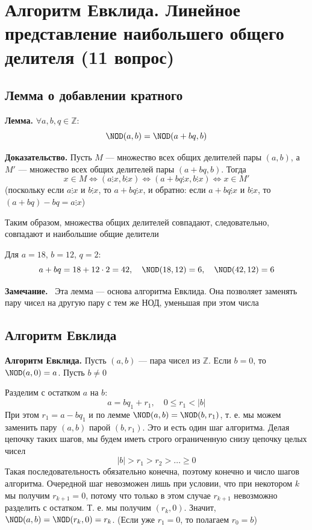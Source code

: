 \documentclass[a4paper,12pt]{article}
\newcommand{\myremark}{\textbf{Замечание.}\ }
\theoremstyle{definition}
\theoremstyle{plain}
\theoremstyle{remark}
\begin{document}
	
	
	
	
	\newpage
	\section{Алгоритм Евклида. Линейное представление наибольшего общего делителя (11 вопрос)}
	
	\subsection{Лемма о добавлении кратного}
	
	\noindent \textbf{Лемма.}
	$\forall a, b, q \in \mathbb{Z}$:
	\[
	\NOD(a, b) = \NOD(a + bq, b)
	\]
	
	\medskip
	\noindent \textbf{Доказательство.}
	Пусть $M$ — множество всех общих делителей пары $(a, b)$, а $M'$ — множество всех общих делителей пары $(a + bq, b)$. Тогда
	\[
	x \in M \iff (a \vdots x, b \vdots x) \iff (a + bq \vdots x, b \vdots x) \iff x \in M'
	\]
	(поскольку если $a \vdots x$ и $b \vdots x$, то $a + bq \vdots x$, и обратно: если $a + bq \vdots x$ и $b \vdots x$, то $(a + bq) - bq = a \vdots x$)
	
	Таким образом, множества общих делителей совпадают, следовательно, совпадают и наибольшие общие делители
	
	\begin{tcolorbox}[colback=blue!5, colframe=blue!40!black, title=Пример]
	Для $a = 18$, $b = 12$, $q = 2$:
	\[
	a + bq = 18 + 12 \cdot 2 = 42,\quad \NOD(18,12)=6,\quad \NOD(42,12)=6
	\]
	\end{tcolorbox}
	
	\myremark
	Эта лемма — основа алгоритма Евклида. Она позволяет заменять пару чисел на другую пару с тем же НОД, уменьшая при этом числа
	
	\subsection{Алгоритм Евклида}
	
	\noindent \textbf{Алгоритм Евклида.}
	Пусть $(a, b)$ — пара чисел из $\mathbb{Z}$. Если $b = 0$, то $\NOD(a, 0) = a$. Пусть $b \neq 0$
	
	Разделим с остатком $a$ на $b$:
	\[
	a = bq_1 + r_1, \quad 0 \leq r_1 < |b|
	\]
	При этом $r_1 = a - bq_1$ и по лемме $\NOD(a, b) = \NOD(b, r_1)$, т. е. мы можем заменить пару $(a, b)$ парой $(b, r_1)$. Это и есть один шаг алгоритма. Делая цепочку таких шагов, мы будем иметь строго ограниченную снизу цепочку целых чисел
	\[
	|b| > r_1 > r_2 > \dots \geq 0
	\]
	Такая последовательность обязательно конечна, поэтому конечно и число шагов алгоритма. Очередной шаг невозможен лишь при условии, что при некотором $k$ мы получим $r_{k+1} = 0$, потому что только в этом случае $r_{k+1}$ невозможно разделить с остатком. Т. е. мы получим $(r_k, 0)$. Значит, $\NOD(a, b) = \NOD(r_k, 0) = r_k$. (Если уже $r_1 = 0$, то полагаем $r_0 = b$)
\end{document}
